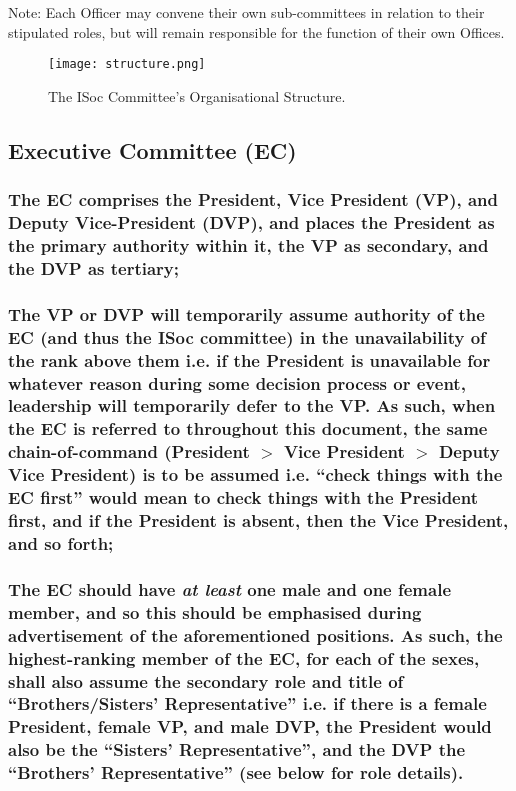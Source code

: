 \documentclass[12pt]{article}
\begin{document}
Note: Each Officer may convene their own sub-committees in relation to their stipulated roles, but will remain responsible for the function of their own Offices.

\begin{figure}[h]
\centerline{\texttt{[image: structure.png]}}
\caption{The ISoc Committee's Organisational Structure.}
\label{fig:structure}
\end{figure}

\subsection{Executive Committee (EC)}
\label{sec:EC}

\subsubsection{The EC comprises the President, Vice President (VP), and Deputy Vice-President (DVP), and places the President as the primary authority within it, the VP as secondary, and the DVP as tertiary;}
\subsubsection{The VP or DVP will temporarily assume authority of the EC (and thus the ISoc committee) in the unavailability of the rank above them i.e. if the President is unavailable for whatever reason during some decision process or event, leadership will temporarily defer to the VP. As such, when the EC is referred to throughout this document, the same chain-of-command (President $>$ Vice President $>$ Deputy Vice President) is to be assumed i.e. ``check things with the EC first'' would mean to check things with the President first, and if the President is absent, then the Vice President, and so forth;}
\subsubsection{The EC should have \emph{at least} one male and one female member, and so this should be emphasised during advertisement of the aforementioned positions. As such, the highest-ranking member of the EC, for each of the sexes, shall also assume the secondary role and title of ``Brothers/Sisters' Representative'' i.e. if there is a female President, female VP, and male DVP, the President would also be the ``Sisters' Representative'', and the DVP the ``Brothers' Representative'' (see below for role details).}\label{subsec:equality}
\end{document}

